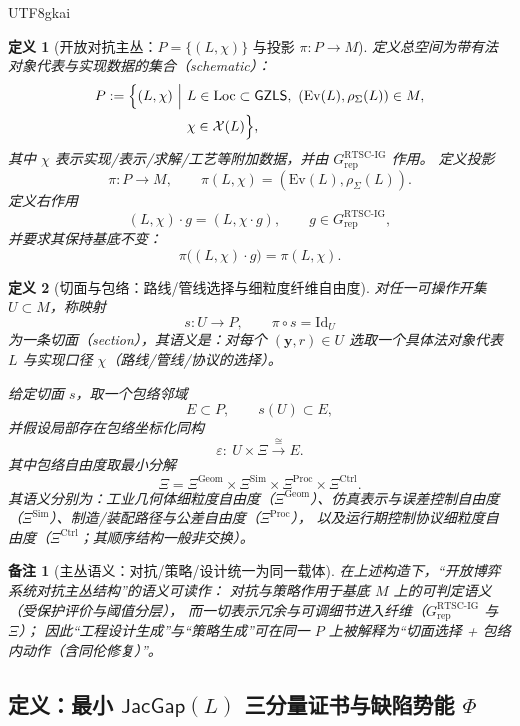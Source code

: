 \documentclass[12pt]{article}
\newtheorem{definition}{定义}[section]
\newtheorem{remark}{备注}[section]
\newcommand{\GZLS}{\ensuremath{\mathsf{GZLS}}}
\newcommand{\JacGap}{\ensuremath{\mathsf{JacGap}}}
\begin{document}
\begin{CJK*}{UTF8}{gkai}
\begin{definition}[开放对抗主丛：$P=\{(L,\chi)\}$ 与投影 $\pi:P\to M$]
\label{def:rtsc-ig-principal-bundle}
定义总空间为带有法对象代表与实现数据的集合（schematic）：
\[
\begin{aligned}
P
:=
\Bigl\{
(L,\chi)\ \Big|\
&L\in \mathrm{Loc}\subset\GZLS,\ (\mathrm{Ev}(L),\rho_{\Sigma}(L))\in M,\\
&\chi\in \mathcal{X}(L)
\Bigr\},
\end{aligned}
\]
其中 $\chi$ 表示实现/表示/求解/工艺等附加数据，并由 $G_{\mathrm{rep}}^{\mathrm{RTSC\text{-}IG}}$ 作用。
定义投影
\[
\pi:P\to M,\qquad
\pi(L,\chi)=(\mathrm{Ev}(L),\rho_{\Sigma}(L)).
\]
定义右作用
\[
(L,\chi)\cdot g=(L,\chi\cdot g),\qquad g\in G_{\mathrm{rep}}^{\mathrm{RTSC\text{-}IG}},
\]
并要求其保持基底不变：
\[
\pi\bigl((L,\chi)\cdot g\bigr)=\pi(L,\chi).
\]
\end{definition}

\begin{definition}[切面与包络：路线/管线选择与细粒度纤维自由度]
\label{def:rtsc-ig-section-envelope}
对任一可操作开集 $U\subset M$，称映射
\[
s:U\to P,\qquad \pi\circ s=\mathrm{Id}_U
\]
为一条切面（section），其语义是：对每个 $(\mathbf{y},r)\in U$ 选取一个具体法对象代表 $L$ 与实现口径 $\chi$（路线/管线/协议的选择）。

给定切面 $s$，取一个包络邻域
\[
E\subset P,\qquad s(U)\subset E,
\]
并假设局部存在包络坐标化同构
\[
\varepsilon:\ U\times\Xi \xrightarrow{\ \cong\ } E.
\]
其中包络自由度取最小分解
\[
\Xi
=
\Xi^{\mathrm{Geom}}
\times
\Xi^{\mathrm{Sim}}
\times
\Xi^{\mathrm{Proc}}
\times
\Xi^{\mathrm{Ctrl}}.
\]
其语义分别为：工业几何体细粒度自由度（$\Xi^{\mathrm{Geom}}$）、仿真表示与误差控制自由度（$\Xi^{\mathrm{Sim}}$）、制造/装配路径与公差自由度（$\Xi^{\mathrm{Proc}}$），
  以及运行期控制协议细粒度自由度（$\Xi^{\mathrm{Ctrl}}$；其顺序结构一般非交换）。
\end{definition}

\begin{remark}[主丛语义：对抗/策略/设计统一为同一载体]
在上述构造下，“开放博弈系统对抗主丛结构”的语义可读作：
对抗与策略作用于基底 $M$ 上的可判定语义（受保护评价与阈值分层），
而一切表示冗余与可调细节进入纤维（$G_{\mathrm{rep}}^{\mathrm{RTSC\text{-}IG}}$ 与 $\Xi$）；
因此“工程设计生成”与“策略生成”可在同一 $P$ 上被解释为“切面选择 + 包络内动作（含同伦修复）”。
\end{remark}

\subsection{定义：最小 $\JacGap(L)$ 三分量证书与缺陷势能 $\Phi$}


\end{CJK*}
\end{document}
